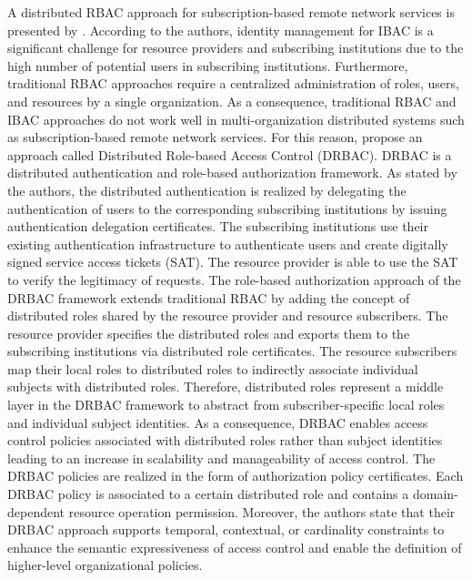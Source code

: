 A distributed RBAC approach for subscription-based remote network services is presented by \citeauthor{Ma2006} \cite{Ma2006a,Ma2006}.
According to the authors, identity management for IBAC is a significant challenge for resource providers and subscribing institutions due to the high number of potential users in subscribing institutions.
Furthermore, traditional RBAC approaches require a centralized administration of roles, users, and resources by a single organization.
As a consequence, traditional RBAC and IBAC approaches do not work well in multi-organization distributed systems such as subscription-based remote network services.
For this reason, \citeauthor{Ma2006} propose an approach called Distributed Role-based Access Control (DRBAC).
DRBAC is a distributed authentication and role-based authorization framework.
As stated by the authors, the distributed authentication is realized by delegating the authentication of users to the corresponding subscribing institutions by issuing authentication delegation certificates.
The subscribing institutions use their existing authentication infrastructure to authenticate users and create digitally signed service access tickets (SAT).
The resource provider is able to use the SAT to verify the legitimacy of requests.
The role-based authorization approach of the DRBAC framework extends traditional RBAC by adding the concept of distributed roles shared by the resource provider and resource subscribers.
The resource provider specifies the distributed roles and exports them to the subscribing institutions via distributed role certificates.
The resource subscribers map their local roles to distributed roles to indirectly associate individual subjects with distributed roles.
Therefore, distributed roles represent a middle layer in the DRBAC framework to abstract from subscriber-specific local roles and individual subject identities.
As a consequence, DRBAC enables access control policies associated with distributed roles rather than subject identities leading to an increase in scalability and manageability of access control.
The DRBAC policies are realized in the form of authorization policy certificates.
Each DRBAC policy is associated to a certain distributed role and contains a domain-dependent resource operation permission.
Moreover, the authors state that their DRBAC approach supports temporal, contextual, or cardinality constraints to enhance the semantic expressiveness of access control and enable the definition of higher-level organizational policies.

